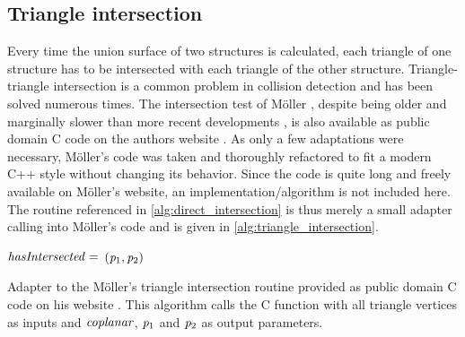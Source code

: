 \subsection{Triangle intersection}
\label{sec:triangle_intersection}

Every time the union surface of two structures is calculated, each triangle of one structure has to be intersected with each triangle of the other structure.
Triangle-triangle intersection is a common problem in collision detection and has been solved numerous times.
The intersection test of Möller \cite{tri_tri_intersection_moller}, despite being older and marginally slower than more recent developments \cite{tri_tri_intersection_2}, is also available as public domain C code on the authors website \cite{tri_tri_intersection_moller_code}.
As only a few adaptations were necessary, Möller's code was taken and thoroughly refactored to fit a modern C++ style without changing its behavior.
Since the code is quite long and freely available on Möller's website, an implementation/algorithm is not included here.
The  routine referenced in \cref{alg:direct_intersection} is thus merely a small adapter calling into Möller's code and is given in \cref{alg:triangle_intersection}.

\begin{algorithm}
	\centering
	\begin{algorithmic}[1]
			\State $\mathit{hasIntersected} =$  
				\State \Return $(\mathit{p}_1, \mathit{p}_2)$ 
			\EndIf
		\EndFunction
	\end{algorithmic}
	\caption{
		Adapter to the Möller's triangle intersection routine provided as public domain C code on his website \cite{tri_tri_intersection_moller_code}.
		This algorithm calls the C function  with all triangle vertices as inputs and $\mathit{coplanar}$, $\mathit{p}_1$ and $\mathit{p}_2$ as output parameters.
	}
	\label{alg:triangle_intersection}
\end{algorithm}

